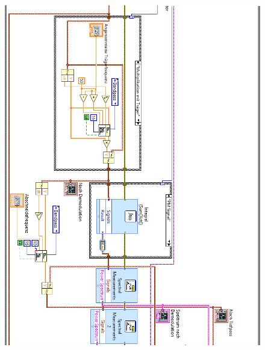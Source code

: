 \begin{figure}[H]
	\centering
	\includegraphics[width=\textwidth]{pic/messstruktur_dafpm2.png}
\end{figure} 
